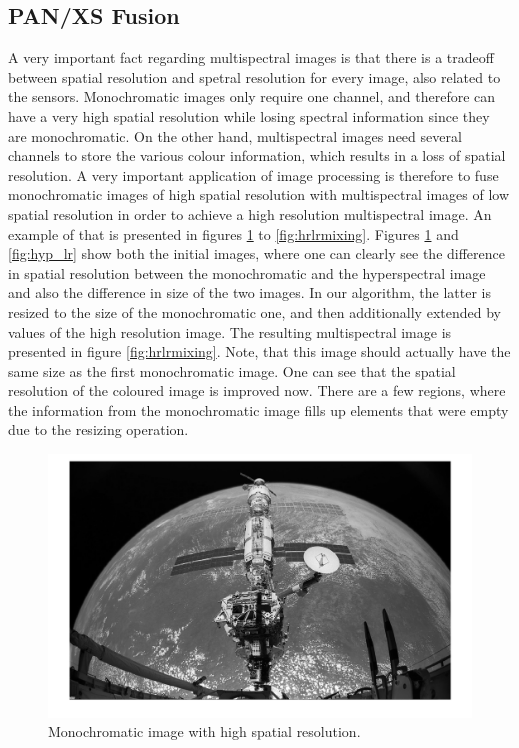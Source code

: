 \subsection{PAN/XS Fusion}
A very important fact regarding multispectral images is that there is a tradeoff between spatial resolution and spetral resolution for every image, also related to the sensors. Monochromatic images only require one channel, and therefore can have a very high spatial resolution while losing spectral information since they are monochromatic. On the other hand, multispectral images need several channels to store the various colour information, which results in a loss of spatial resolution. A very important application of image processing is therefore to fuse monochromatic images of high spatial resolution with multispectral images of low spatial resolution in order to achieve a high resolution multispectral image. An example of that is presented in figures \ref{fig:Ipan_hr} to \ref{fig:hrlrmixing}. Figures \ref{fig:Ipan_hr} and \ref{fig:hyp_lr} show both the initial images, where one can clearly see the difference in spatial resolution between the monochromatic and the hyperspectral image and also the difference in size of the two images. In our algorithm, the latter is resized to the size of the monochromatic one, and then additionally extended by values of the high resolution image. The resulting multispectral image is presented in figure \ref{fig:hrlrmixing}. Note, that this image should actually have the same size as the first monochromatic image. One can see that the spatial resolution of the coloured image is improved now. There are a few regions, where the information from the monochromatic image fills up elements that were empty due to the resizing operation.

\begin{figure}[H]
	\centering
		\includegraphics[scale=0.5]{images/Ipan_hr.png}
		\caption{Monochromatic image with high spatial resolution.}
		\label{fig:Ipan_hr}
\end{figure}

